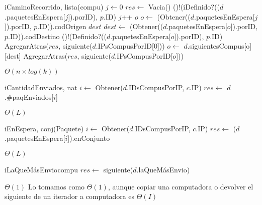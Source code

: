 \begin{Algoritmos}
  \begin{algoritmo}{iCaminoRecorrido}{, }{lista(compu)}
     $j \gets 0$
    $res \gets$ Vacia()
    \While(){!(iDefinido?(($d$.paquetesEnEspera[$j$]).porID), $p$.ID)}{
      $j$++
    }
     $o$
    $o \gets$ (Obtener(($d$.paquetesEnEspera[$j$]).porID, $p$.ID)).codOrigen
     $dest$
    $dest \gets$ (Obtener(($d$.paquetesEnEspera[$o$]).porID, $p$.ID)).codDestino
    \While(){!(Definido?(($d$.paquetesEnEspera[$o$]).porID), $p$.ID)}{
      AgregarAtras($res$, siguiente($d$.IPsCompusPorID[0]))
      $o \gets$ $d$.siguientesCompus[o][dest]
    }
    AgregarAtras($res$, siguiente($d$.IPsCompusPorID[$o$]))
  \end{algoritmo} 
  \datosAlgoritmo{} %
  {} %
  {} %
  {$\Theta(n \times log(k))$} %
  {} %

  \begin{algoritmo}{iCantidadEnviados}{, }{nat}
     $i \gets$ Obtener($d$.IDsCompusPorIP, $c$.IP)
    $res \gets$ $d$.\#paqEnviados[$i$]
  \end{algoritmo}
 \datosAlgoritmo{} %
  {} %
  {} %
  {$\Theta(L)$} %
  {} %

  \begin{algoritmo}{iEnEspera}{, }{conj(Paquete)}
     $i \gets$ Obtener($d$.IDsCompusPorIP, $c$.IP)
    $res \gets$ ($d$.paquetesEnEspera[$i$]).enConjunto
  \end{algoritmo}
 \datosAlgoritmo{} %
  {} %
  {} %
  {$\Theta(L)$} %
  {} %

  \begin{algoritmo}{iLaQueM\'{a}sEnvio}{}{compu}
    $res \gets$ siguiente($d$.laQueM\'{a}sEnvio) 
  \end{algoritmo}
  \datosAlgoritmo{} %
  {} %
  {} %
  {$\Theta(1)$} %
  {Lo tomamos como $\Theta(1)$, aunque copiar una computadora o devolver el siguiente de un iterador a computadora es $\Theta(I)$} %


\end{Algoritmos}
